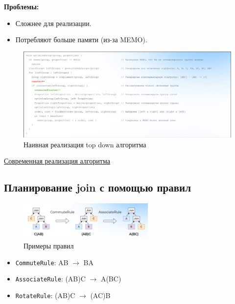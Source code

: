 \documentclass[11pt]{article}
\begin{document}
    \textbf{Проблемы:}

    \begin{itemize}
        \item Сложнее для реализации.
        \item Потребляют больше памяти (из-за MEMO).
    \end{itemize}
    
    \begin{figure}[h!]
        \centering
        \includegraphics[width=\textwidth]{Pictures/Dynamic Programming/Top down/Код top down}
        \caption{Наивная реализация top down алгоритма}
    \end{figure}

    \href{https://www.semanticscholar.org/paper/Effective-and-Robust-Pruning-for-Top-Down-Join-Fender-Moerkotte/1953bb7c5f5f74b36588dfd0a6fbdb7098cdc0c6}{Современная реализация алгоритма}

    \subsection{Планирование join с помощью правил}

    \begin{figure}[h!]
        \centering
        \includegraphics[width=0.6\textwidth]{Pictures/Rules/Деревья}
        \caption{Примеры правил}
    \end{figure}

    \begin{itemize}
        \item \texttt{CommuteRule}: AB $\rightarrow$ BA
        \item \texttt{AssociateRule}: (AB)C $\rightarrow$ A(BC)
        \item \texttt{RotateRule}: (AB)C $\rightarrow$ (AC)B
    \end{itemize}
\end{document}
